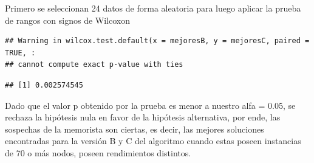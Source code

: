 \documentclass[
]{article}
\newenvironment{Shaded}{\begin{snugshade}}{\end{snugshade}}
\newcommand{\AttributeTok}[1]{\textcolor[rgb]{0.77,0.63,0.00}{#1}}
\newcommand{\ConstantTok}[1]{\textcolor[rgb]{0.00,0.00,0.00}{#1}}
\newcommand{\DecValTok}[1]{\textcolor[rgb]{0.00,0.00,0.81}{#1}}
\newcommand{\FloatTok}[1]{\textcolor[rgb]{0.00,0.00,0.81}{#1}}
\newcommand{\FunctionTok}[1]{\textcolor[rgb]{0.00,0.00,0.00}{#1}}
\newcommand{\NormalTok}[1]{#1}
\newcommand{\OtherTok}[1]{\textcolor[rgb]{0.56,0.35,0.01}{#1}}
\newcommand{\SpecialCharTok}[1]{\textcolor[rgb]{0.00,0.00,0.00}{#1}}
\newcommand{\StringTok}[1]{\textcolor[rgb]{0.31,0.60,0.02}{#1}}
\begin{document}
Primero se seleccionan 24 datos de forma aleatoria para luego aplicar la
prueba de rangos con signos de Wilcoxon

\begin{Shaded}
\end{Shaded}

\begin{verbatim}
## Warning in wilcox.test.default(x = mejoresB, y = mejoresC, paired = TRUE, :
## cannot compute exact p-value with ties
\end{verbatim}

\begin{Shaded}
\end{Shaded}

\begin{verbatim}
## [1] 0.002574545
\end{verbatim}

Dado que el valor p obtenido por la prueba es menor a nuestro alfa =
0.05, se rechaza la hipótesis nula en favor de la hipótesis alternativa,
por ende, las sospechas de la memorista son ciertas, es decir, las
mejores soluciones encontradas para la versión B y C del algoritmo
cuando estas poseen instancias de 70 o más nodos, poseen rendimientos
distintos.
\end{document}
